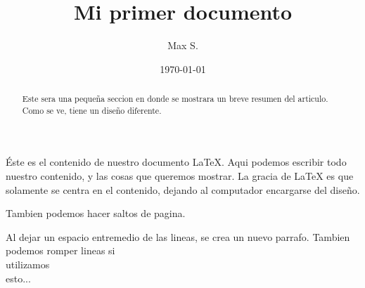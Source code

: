 \documentclass[12pt]{article}
\title{Mi primer documento}
\author{Max S.}
\date{\today}
\begin{document}
    \begin{titlepage}
        \maketitle
    \end{titlepage}

    \begin{abstract}
        Este sera una pequeña seccion en donde se mostrara un breve resumen del
        articulo. Como se ve, tiene un diseño diferente.
    \end{abstract}

    Éste es el contenido de nuestro documento \LaTeX. Aqui podemos escribir
    todo nuestro contenido, y las cosas que queremos mostrar. La gracia de \LaTeX
    es que solamente se centra en el contenido, dejando al computador encargarse
    del diseño.

    Tambien podemos hacer saltos de pagina.

    \newpage

    Al dejar un espacio entremedio de las lineas, se crea un nuevo parrafo.
    Tambien podemos romper lineas si \\ utilizamos \\ esto...
\end{document}
